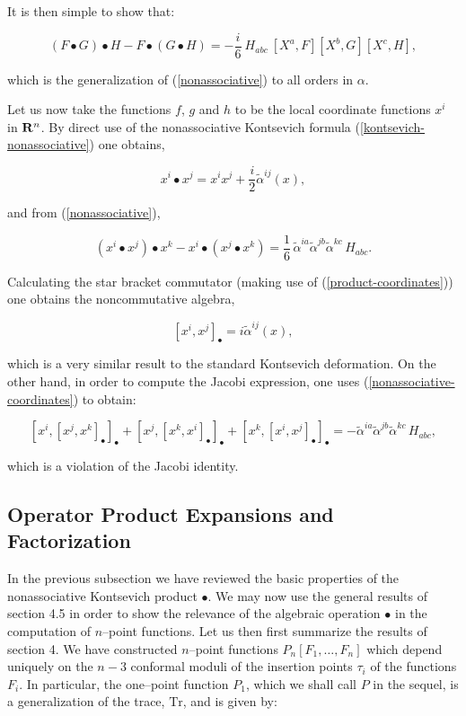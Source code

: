 \documentclass[a4paper,11pt]{article}
\newcommand{\mathbb}[1]{{\bf{#1}}}
\begin{document}
\noindent
It is then simple to show that:

$$
\left( F\bullet G\right) \bullet H - F\bullet \left( G\bullet H\right) = - 
\frac{i}{6}\ H_{abc}\ [ X^{a},F ] [ X^{b},G ] [ X^{c},H ] ,
$$

\noindent
which is the generalization of (\ref{nonassociative}) to all orders in
$\alpha$.

Let us now take the functions $f$, $g$ and $h$ to be the local coordinate
functions $x^{i}$ in $\mathbb{R}^{n}$. By direct use of the nonassociative
Kontsevich formula (\ref{kontsevich-nonassociative}) one obtains,

\begin{equation}  \label{product-coordinates}
x^{i} \bullet x^{j} = x^{i} x^{j} + {\frac{i}{2}} \widetilde{\alpha}^{ij}(x),
\end{equation}

\noindent 
and from (\ref{nonassociative}),

\begin{equation}  \label{nonassociative-coordinates}
\left( x^{i} \bullet x^{j} \right) \bullet x^{k} - x^{i} \bullet \left(
x^{j} \bullet x^{k} \right) = \frac{1}{6}\, \widetilde{\alpha}^{ia} 
\widetilde{\alpha}^{jb} \widetilde{\alpha}^{kc}\, H_{abc} .
\end{equation}

\noindent 
Calculating the star bracket commutator (making use of
(\ref{product-coordinates})) one obtains the noncommutative algebra,

$$
[x^{i}, x^{j}]_{\bullet} = i \widetilde{\alpha}^{ij}(x),
$$

\noindent 
which is a very similar result to the standard Kontsevich deformation. On
the other hand, in order to compute the Jacobi expression, one uses
(\ref{nonassociative-coordinates}) to obtain:

$$
[x^{i}, [x^{j}, x^{k}]_{\bullet}]_{\bullet} + [x^{j}, [x^{k},
x^{i}]_{\bullet}]_{\bullet} + [x^{k}, [x^{i}, x^{j}]_{\bullet}]_{\bullet} =
- \widetilde{\alpha}^{ia} \widetilde{\alpha}^{jb} \widetilde{\alpha}^{kc}\, H_{abc},
$$

\noindent 
which is a violation of the Jacobi identity.


\subsection{Operator Product Expansions and Factorization}


In the previous subsection we have reviewed the basic properties of the
nonassociative Kontsevich product $\bullet$. We may now use the general
results of section 4.5 in order to show the relevance of the algebraic
operation $\bullet$ in the computation of $n$--point functions. Let us then
first summarize the results of section 4. We have constructed $n$--point
functions $P_{n} \left[ F_{1}, \dots, F_{n} \right]$ which depend uniquely
on the $n-3$ conformal moduli of the insertion points $\tau_{i}$ of the
functions $F_{i}$. In particular, the one--point function $P_{1}$, which we
shall call $P$ in the sequel, is a generalization of the trace,
$\mathrm{Tr}$, and is given by:
\end{document}
